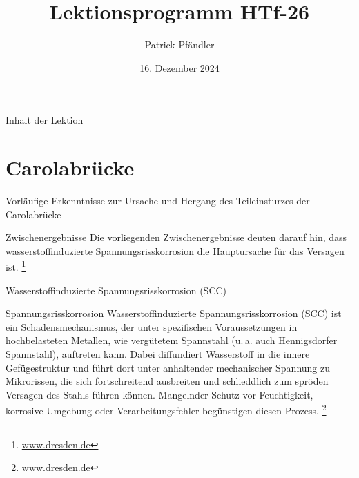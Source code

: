 \def\customoptions{aspectratio=169} %

\title{\textbf{Lektionsprogramm HTf-26}}
\author{Patrick Pfändler}
\date{16. Dezember 2024}




\frame{\titlepage}

\begin{frame}{Inhalt der Lektion}
	\tableofcontents
\end{frame}

\section{Carolabrücke}
\begin{frame}{Vorläufige Erkenntnisse zur Ursache und Hergang des Teileinsturzes der Carolabrücke}
    \begin{block}{Zwischenergebnisse}
        Die vorliegenden Zwischenergebnisse deuten darauf hin, dass wasserstoffinduzierte Spannungsrisskorrosion die Hauptursache für das Versagen ist.
        \footnote{\href{        \footnote{https://www.dresden.de/media/pdf/presseamt/2024_12_11_Carolabruecke_Zusammenfassung-Ergebnisse.pdf}}{www.dresden.de}}
    \end{block}

\end{frame}

\begin{frame}{Wasserstoffinduzierte Spannungsrisskorrosion (SCC)}
    \begin{Definition_BS}{Spannungsrisskorrosion}
        Wasserstoffinduzierte Spannungsrisskorrosion (SCC) ist ein Schadensmechanismus, der unter spezifischen Voraussetzungen in
        hochbelasteten Metallen, wie vergütetem Spannstahl (u.\,a. auch Hennigsdorfer Spannstahl), auftreten kann. Dabei diffundiert Wasserstoff in die innere Gefügestruktur und führt dort unter anhaltender mechanischer Spannung zu Mikrorissen, die sich fortschreitend ausbreiten und
        schlieddlich zum spröden Versagen des Stahls führen können. Mangelnder Schutz vor Feuchtigkeit, korrosive Umgebung oder
        Verarbeitungsfehler begünstigen diesen Prozess.
        \footnote{\href{        \footnote{https://www.dresden.de/media/pdf/presseamt/2024_12_11_Carolabruecke_Zusammenfassung-Ergebnisse.pdf}}{www.dresden.de}}
    \end{Definition_BS}
\end{frame}


